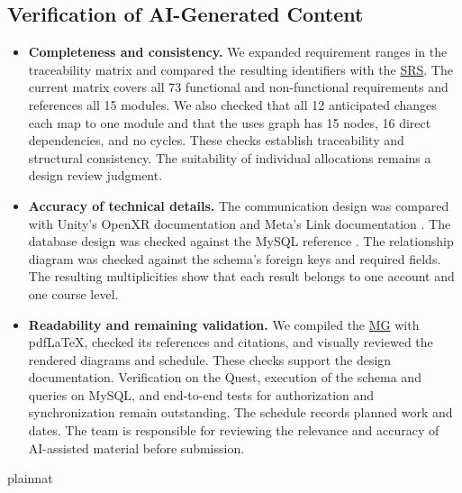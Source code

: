 \documentclass[12pt, titlepage]{article}
\DeclareRobustCommand{\mgabbr}[2]{\hyperlink{mg-abbr:#1}{#2}}
\begin{document}
\subsection{Verification of AI-Generated Content}

\begin{itemize}
\item \textbf{Completeness and consistency.} We expanded requirement ranges
in the traceability matrix and compared the resulting identifiers with the
\mgabbr{srs}{SRS}. The current matrix covers all 73 functional and
non-functional requirements and references all 15 modules. We also
checked that all 12 anticipated changes each map to one module and that
the uses graph has 15 nodes, 16 direct dependencies, and no cycles.
These checks establish traceability and structural consistency. The
suitability of individual allocations remains a design review judgment.

\item \textbf{Accuracy of technical details.} The communication design
was compared with Unity's OpenXR documentation and Meta's Link
documentation \citep{UnityOpenXRInput,MetaHorizonLink}. The database
design was checked against the MySQL reference \citep{MySQL84Manual}.
The relationship diagram was checked against the schema's foreign keys
and required fields. The resulting multiplicities show that each result
belongs to one account and one course level.

\item \textbf{Readability and remaining validation.} We compiled the
\mgabbr{mg}{MG} with pdfLaTeX, checked its references and citations,
and visually reviewed the rendered diagrams and schedule. These checks
support the design documentation. Verification on the Quest, execution
of the schema and queries on MySQL, and end-to-end tests for authorization
and synchronization remain outstanding. The schedule records planned
work and dates. The team is responsible for reviewing the relevance and
accuracy of AI-assisted material before submission.
\end{itemize}

\newpage{}

 {plainnat}

\end{document}
